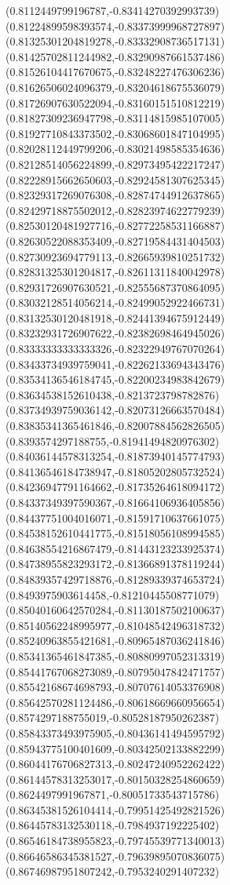 \documentclass[12pt]{article}
\theoremstyle{plain}
\theoremstyle{definition}
\theoremstyle{remark}
\begin{document}
\begin{figure}
{  (0.8112449799196787,-0.83414270392993739)%
  (0.81224899598393574,-0.83373999968727897)%
  (0.81325301204819278,-0.83332908736517131)%
  (0.81425702811244982,-0.83290987661537486)%
  (0.81526104417670675,-0.83248227476306236)%
  (0.81626506024096379,-0.83204618675536079)%
  (0.81726907630522094,-0.83160151510812219)%
  (0.81827309236947798,-0.83114815985107005)%
  (0.81927710843373502,-0.83068601847104995)%
  (0.82028112449799206,-0.83021498585354636)%
  (0.82128514056224899,-0.82973495422217247)%
  (0.82228915662650603,-0.82924581307625345)%
  (0.82329317269076308,-0.82874744912637865)%
  (0.82429718875502012,-0.82823974622779239)%
  (0.82530120481927716,-0.82772258531166887)%
  (0.82630522088353409,-0.82719584431404503)%
  (0.82730923694779113,-0.82665939810251732)%
  (0.82831325301204817,-0.82611311840042978)%
  (0.82931726907630521,-0.82555687370864095)%
  (0.83032128514056214,-0.82499052922466731)%
  (0.83132530120481918,-0.82441394675912449)%
  (0.83232931726907622,-0.82382698464945026)%
  (0.83333333333333326,-0.82322949767070264)%
  (0.83433734939759041,-0.82262133694343476)%
  (0.83534136546184745,-0.82200234983842679)%
  (0.83634538152610438,-0.8213723798782876)%
  (0.83734939759036142,-0.82073126663570484)%
  (0.83835341365461846,-0.82007884562826505)%
  (0.8393574297188755,-0.81941494820976302)%
  (0.84036144578313254,-0.81873940145774793)%
  (0.84136546184738947,-0.81805202805732524)%
  (0.84236947791164662,-0.81735264618094172)%
  (0.84337349397590367,-0.81664106936405856)%
  (0.84437751004016071,-0.81591710637661075)%
  (0.84538152610441775,-0.81518056108994585)%
  (0.84638554216867479,-0.81443123233925374)%
  (0.84738955823293172,-0.81366891378119244)%
  (0.84839357429718876,-0.81289339374653724)%
  (0.8493975903614458,-0.81210445508771079)%
  (0.85040160642570284,-0.81130187502100637)%
  (0.85140562248995977,-0.81048542496318732)%
  (0.85240963855421681,-0.80965487036241846)%
  (0.85341365461847385,-0.80880997052313319)%
  (0.85441767068273089,-0.80795047842471757)%
  (0.85542168674698793,-0.80707614053376908)%
  (0.85642570281124486,-0.80618669660956654)%
  (0.8574297188755019,-0.80528187950262387)%
  (0.85843373493975905,-0.80436141494595792)%
  (0.85943775100401609,-0.80342502133882299)%
  (0.86044176706827313,-0.80247240952262422)%
  (0.86144578313253017,-0.80150328254860659)%
  (0.8624497991967871,-0.80051733543715786)%
  (0.86345381526104414,-0.79951425492821526)%
  (0.86445783132530118,-0.7984937192225402)%
  (0.86546184738955823,-0.79745539771340013)%
  (0.86646586345381527,-0.79639895070836075)%
  (0.86746987951807242,-0.7953240291407232)%
}
\end{figure}
\end{document}
